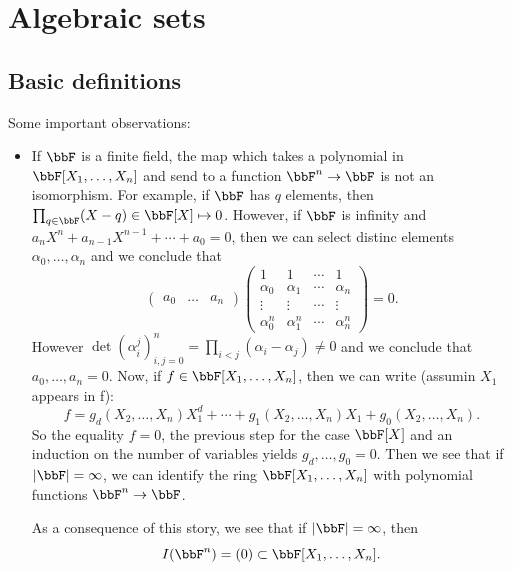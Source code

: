 \chapter{Algebraic sets}
\section{Basic definitions}
Some important observations:
\begin{itemize}
    \item If $\bbF$ is a finite field, the map which takes a polynomial in $\bbF[X_1,\dots,X_n]$ and 
    send to a function $\bbF^n\to \bbF$ is not an isomorphism. For example, if $\bbF$ 
    has $q$ elements, then $\prod_{q\in\bbF}(X-q)\in\bbF[X]\mapsto 0$. However, if $\bbF$ is infinity and 
    $a_nX^n + a_{n-1}X^{n-1}+\cdots + a_0 = 0$, then we can select distinc elements $\alpha_0,\dots,\alpha_{n}$ and 
    we conclude that 
    \begin{equation}
        \begin{pmatrix}a_0&\dots&a_n\end{pmatrix}
       \begin{pmatrix}
            1&1&\cdots&1\\\alpha_0&\alpha_1&\cdots&\alpha_{n}\\\vdots&\vdots&\cdots&\vdots\\
            \alpha_0^n&\alpha_1^n&\cdots&\alpha_{n}^{n}
        \end{pmatrix}=0.
    \end{equation}
    However $\det(\alpha_i^j)_{i,j=0}^n=\prod_{i<j}(\alpha_i-\alpha_j)\neq0$ and we conclude that $a_0,\dots,a_n=0$. 
    Now, if $f\in \bbF[X_1,\dots,X_n]$, then we can write (assumin $X_1$ appears in f):
    \begin{equation}
        f = g_d(X_2,\dots,X_n)X_1^d +\cdots + g_1(X_2,\dots,X_n)X_1 + g_0(X_2,\dots,X_n).
    \end{equation}
    So the equality $f=0$, the previous step for the case $\bbF[X]$ and an induction on the number of variables yields
    $g_d,\dots,g_0 =0$. Then we see that if $|\bbF|=\infty$, we can identify the ring $\bbF[X_1,\dots,X_n]$ with 
    polynomial functions $\bbF^n\to\bbF$.\par 

    As a consequence of this story, we see that if $|\bbF|=\infty$, then 
    \begin{equation}
        I(\bbF^n)=(0)\subset\bbF[X_1,\dots,X_n].
    \end{equation}


\end{itemize}
